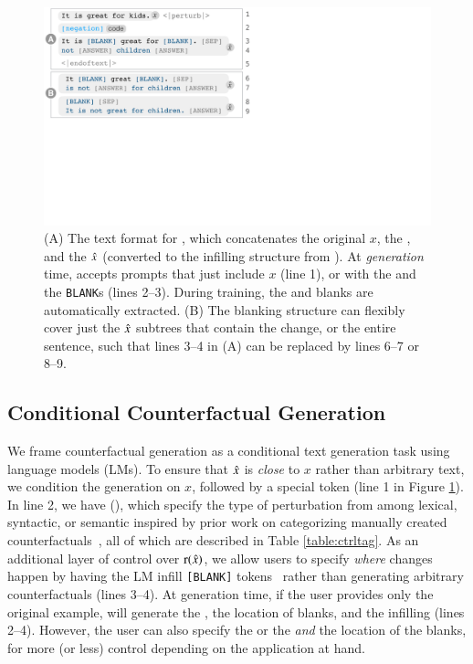 \begin{figure}[t]
\centering
\includegraphics[trim={0 18.6cm 31.5cm 0cm}, clip, width=1\columnwidth]{figures/blank.pdf}
\vspace{-15pt}
\caption{  
(A) The text format for \sysname, which concatenates the original $x$, the \tagstr, and the $\hat{x}$ (converted to the infilling structure from ).
At \emph{generation} time, \sysname accepts prompts that just include $x$ (line 1), or with the \tagstrshort and the \texttt{BLANK}s (lines 2--3).
During training, the \tagstrshorts and blanks are automatically extracted.
(B) The blanking structure can flexibly cover just the $\hat{x}$ subtrees that contain the change, or the entire sentence, such that lines 3--4 in (A) can be replaced by lines 6--7 or 8--9.
}
\vspace{-10pt}
\label{fig:blank}
\end{figure}


\subsection{Conditional Counterfactual Generation}
\label{subsec:nlg}


\TagTable

We frame counterfactual generation as a conditional text generation task using language models (LMs). To ensure that $\hat{x}$ is \emph{close} to $x$ rather than arbitrary text, we condition the generation on $x$, followed by a special token (line 1 in Figure \ref{fig:blank}).
In line 2, we have \emph{\tagstrs} (\eg {}), which specify the type of perturbation from among lexical, syntactic, or semantic \tagstrshorts inspired by prior work on categorizing manually created counterfactuals~\cite{kaushik2019learning, gardner2020contrast}, all of which are described in Table \ref{table:ctrltag}. 
As an additional layer of control over $\operatorname*{r}(\hat{x})$, we allow users to specify \emph{where} changes happen by having the LM infill \texttt{[BLANK]} tokens~\cite{donahue2020enabling} rather than generating arbitrary counterfactuals (lines 3--4).
At generation time, if the user provides only the original example, \sysname will generate the \tagstr, the location of blanks, and the infilling (lines 2--4). However, the user can also specify the \tagstr or the \tagstr \emph{and} the location of the blanks, for more (or less) control depending on the application at hand.

